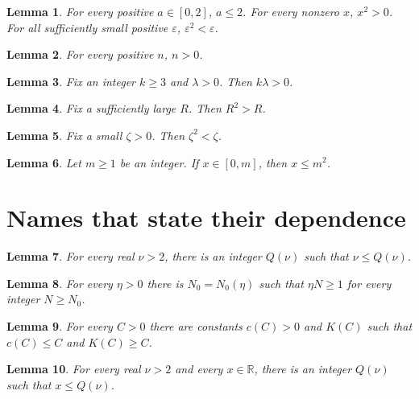 \documentclass{article}
\newtheorem{lemma}{Lemma}
\begin{document}
\begin{lemma}\label{adjectives-alone}
For every positive $a\in[0,2]$, $a\le2$. For every nonzero $x$, $x^2>0$. For all sufficiently small positive $\varepsilon$, $\varepsilon^2<\varepsilon$.
\end{lemma}

\begin{lemma}\label{adjectives-index}
For every positive $n$, $n>0$.
\end{lemma}

\begin{lemma}\label{fix-and}
Fix an integer $k\ge3$ and $\lambda>0$. Then $k\lambda>0$.
\end{lemma}

\begin{lemma}\label{fix-large}
Fix a sufficiently large $R$. Then $R^2>R$.
\end{lemma}

\begin{lemma}\label{fix-small}
Fix a small $\zeta>0$. Then $\zeta^2<\zeta$.
\end{lemma}

\begin{lemma}\label{result-variable}
Let $m\ge1$ be an integer. If $x\in[0,m]$, then $x\le m^2$.
\end{lemma}

\section{Names that state their dependence}

\begin{lemma}\label{depends}
For every real $\nu>2$, there is an integer $Q(\nu)$ such that $\nu\le Q(\nu)$.
\end{lemma}

\begin{lemma}\label{depends-equal}
For every $\eta>0$ there is $N_0=N_0(\eta)$ such that $\eta N\ge1$ for every integer $N\ge N_0$.
\end{lemma}

\begin{lemma}\label{depends-two}
For every $C>0$ there are constants $c(C)>0$ and $K(C)$ such that $c(C)\le C$ and $K(C)\ge C$.
\end{lemma}

\begin{lemma}\label{depends-wrong}
For every real $\nu>2$ and every $x\in\mathbb R$, there is an integer $Q(\nu)$ such that $x\le Q(\nu)$.
\end{lemma}
\end{document}

